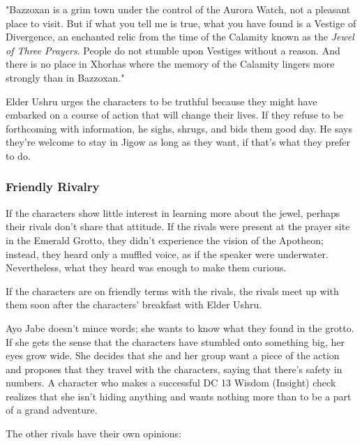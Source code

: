 \documentclass[10pt,a4paper,twoside,fancy,bg=print,twocolumn,openany,nodeprecatedcode]{dndbook}
\begin{document}
\begin{DndReadAloud}{}
"Bazzoxan is a grim town under the control of the Aurora Watch, not a pleasant place to visit. But if what you tell me is true, what you have found is a Vestige of Divergence, an enchanted relic from the time of the Calamity known as the \textit{Jewel of Three Prayers}. People do not stumble upon Vestiges without a reason. And there is no place in Xhorhas where the memory of the Calamity lingers more strongly than in Bazzoxan."

\end{DndReadAloud}

Elder Ushru urges the characters to be truthful because they might have embarked on a course of action that will change their lives. If they refuse to be forthcoming with information, he sighs, shrugs, and bids them good day. He says they're welcome to stay in Jigow as long as they want, if that's what they prefer to do.

\subsubsection{Friendly Rivalry}
If the characters show little interest in learning more about the jewel, perhaps their rivals don't share that attitude. If the rivals were present at the prayer site in the Emerald Grotto, they didn't experience the vision of the Apotheon; instead, they heard only a muffled voice, as if the speaker were underwater. Nevertheless, what they heard was enough to make them curious.

If the characters are on friendly terms with the rivals, the rivals meet up with them soon after the characters' breakfast with Elder Ushru.

Ayo Jabe doesn't mince words; she wants to know what they found in the grotto. If she gets the sense that the characters have stumbled onto something big, her eyes grow wide. She decides that she and her group want a piece of the action and proposes that they travel with the characters, saying that there's safety in numbers. A character who makes a successful DC 13 Wisdom (Insight) check realizes that she isn't hiding anything and wants nothing more than to be a part of a grand adventure.

The other rivals have their own opinions:
\end{document}
